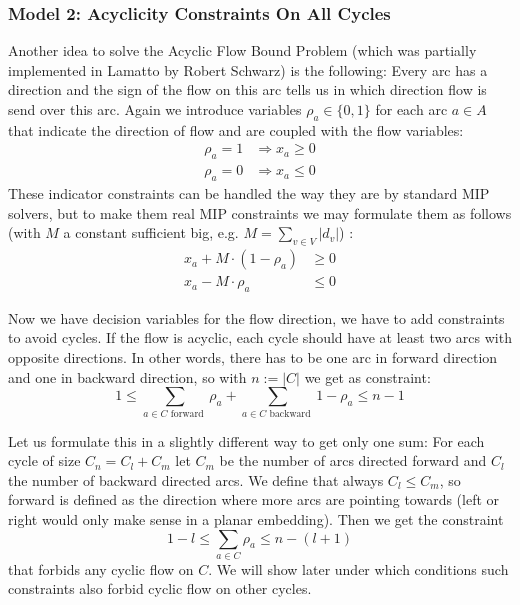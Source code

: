 \subsubsection{Model 2: Acyclicity Constraints On All Cycles}

Another idea to solve the Acyclic Flow Bound Problem (which was partially implemented in Lamatto by Robert Schwarz) is 
the following: Every arc has a direction and the 
sign of the flow on this arc tells us in which direction flow is send over this arc. Again we introduce variables 
$\rho_a\in \{0,1\}$ for each arc $a\in A$ that indicate the direction of flow and are coupled with the flow variables:
\begin{align*}
\rho_a=1 & \Rightarrow x_a\ge 0 \\
\rho_a=0 & \Rightarrow x_a\le 0
\end{align*}
These indicator constraints can be handled the way they are by standard MIP solvers, but to make them real MIP 
constraints we may formulate them as follows (with $M$ a constant sufficient big, e.g. $M=\sum_{v\in V}|d_v|$) :
\begin{align*}
 x_a + M\cdot (1-\rho_a) &\ge 0\\
 x_a - M\cdot \rho_a & \le 0
\end{align*}



Now we have decision variables for the flow direction, we have to add constraints to avoid cycles. If the flow is 
acyclic, each cycle should have at least two arcs with opposite directions. In other words, there has to be one arc
in forward direction and one in backward direction, so with $n:=|C|$ we get as constraint:
$$ 1\le\sum_{a\in C\textrm{ forward }} \rho_a + \sum_{a\in C\textrm{ backward }}1-\rho_a\le n-1$$

Let us formulate this in a slightly different way to get only one sum: For each cycle of size $C_n=C_l+C_m$ 
let $C_m$ be the number of arcs directed forward and $C_l$ the number of backward directed arcs. We define that always 
$C_l\le C_m$, so forward is defined as the direction where more arcs are pointing towards (left or right would only 
make 
sense in a planar embedding). Then we get the constraint $$1-l \le \sum_{a\in C}\rho_a\le n-(l+1)$$ that forbids any
cyclic flow on $C$. We will show later under which conditions such constraints also forbid cyclic flow on other cycles. 

